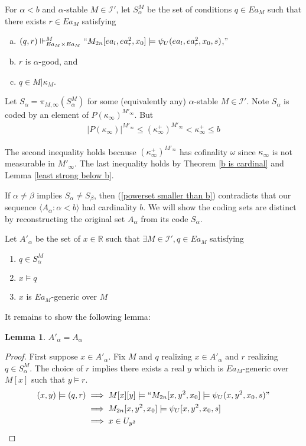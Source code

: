 \documentclass[12pt]{article}
\newtheorem{lemma}[theorem]{Lemma}
\newcommand\I{\mathcal{I}}
\newcommand\R{\mathbb{R}}
\begin{document}
{For $\alpha < b$ and $\alpha$-stable $M\in \I'$, let $S^M_\alpha$ be the set of conditions $q\in Ea_M$ such that there exists $r\in Ea_M$ satisfying
\begin{enumerate}[a)]
    \item $(q,r) \Vdash^M_{Ea_M\times Ea_M} ``M_{2n}[ea_l,ea_r^2,x_0] \models \psi_U(ea_l,ea_r^2,x_0,s)$,''
    \item $r$ is $\alpha$-good, and
    \item $q\in M|\kappa_M$.
\end{enumerate}

Let $S_\alpha = \pi_{M,\infty}(S^M_\alpha)$ for some (equivalently any) $\alpha$-stable $M\in \I'$. Note $S_\alpha$ is coded by an element of $P(\kappa_\infty)^{M'_\infty}$. But
\begin{align}
\label{powerset smaller than b}
    |P(\kappa_\infty)|^{M'_\infty} \leq (\kappa_\infty^+)^{M'_\infty} < \kappa^+_\infty \leq b
\end{align}

The second inequality holds because $(\kappa^+_\infty)^{M'_\infty}$ has cofinality $\omega$ since $\kappa_\infty$ is not measurable in $M'_\infty$. The last inequality holds by Theorem \ref{b is cardinal} and Lemma \ref{least strong below b}.

If $\alpha \neq \beta$ implies $S_\alpha \neq S_\beta$, then (\ref{powerset smaller than b}) contradicts that our sequence $\langle A_\alpha: \alpha < b\rangle$ had cardinality $b$. We will show the coding sets are distinct by reconstructing the original set $A_\alpha$ from its code $S_\alpha$.

Let $A'_\alpha$ be the set of $x\in\R$ such that $\exists M\in \I', q\in Ea_M$ satisfying
\begin{enumerate}
    \item $q\in S^M_\alpha$
    \item $x\models q$
    \item $x$ is $Ea_M$-generic over $M$
\end{enumerate}

It remains to show the following lemma:

\begin{lemma}
    $A'_\alpha = A_\alpha$
\end{lemma}
\begin{proof}
    First suppose $x\in A'_\alpha$. Fix $M$ and $q$ realizing $x\in A'_\alpha$ and $r$ realizing $q\in S^M_\alpha$. The choice of $r$ implies there exists a real $y$ which is $Ea_M$-generic over $M[x]$ such that $y\models r$.
    \begin{align*}
        (x,y)\models (q,r) &\implies M[x][y] \models ``M_{2n}[x,y^2,x_0]\models \psi_U(x,y^2,x_0,s)"\\
        &\implies M_{2n}[x,y^2,x_0]\models \psi_U[x,y^2,x_0,s]\\
        &\implies x\in U_{y^2}
    \end{align*}
    

\end{proof}}
\end{document}
